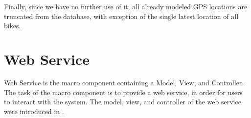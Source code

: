 Finally, since we have no further use of it, all already modeled GPS locations are truncated from the database, with exception of the single latest location of all bikes.

\section{Web Service}\label{arch:webservice}
Web Service is the macro component containing a Model, View, and Controller.
The task of the macro component is to provide a web service, in order for users to interact with the system.
The model, view, and controller of the web service were introduced in .

